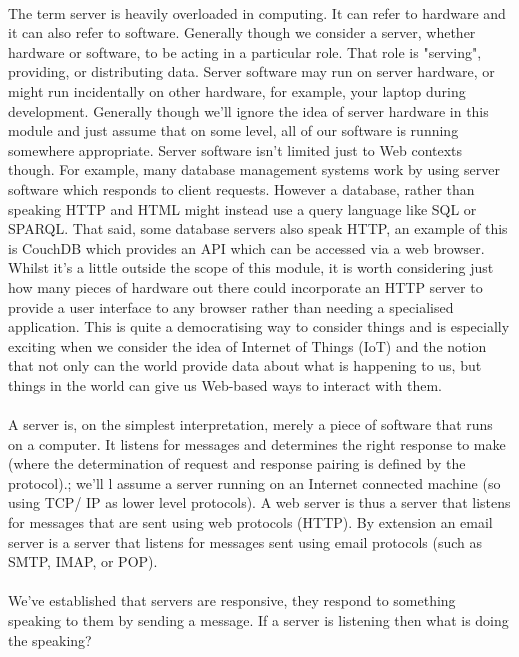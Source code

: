 \documentclass[12pt, a4paper, oneside]{book}
\begin{document}
\paragraph{} The term server is heavily overloaded in computing. It can refer to hardware and it can also refer to software. Generally though we consider a server, whether hardware or software, to be acting in a particular role. That role is "serving", providing, or distributing data. Server software may run on server hardware, or might run incidentally on other hardware, for example, your laptop during development. Generally though we'll ignore the idea of server hardware in this module and just assume that on some level, all of our software is running somewhere appropriate. Server software isn't limited just to Web contexts though. For example, many database management systems work by using server software which responds to client requests. However a database, rather than speaking HTTP and HTML might instead use a query language like SQL or SPARQL. That said, some database servers also speak HTTP, an example of this is CouchDB which provides an API which can be accessed via a web browser. Whilst it's a little outside the scope of this module, it is worth considering just how many pieces of hardware out there could incorporate an HTTP server to provide a user interface to any browser rather than needing a specialised application. This is quite a democratising way to consider things and is especially exciting when we consider the idea of Internet of Things (IoT) and the notion that not only can the world provide data about what is happening to us, but things in the world can give us Web-based ways to interact with them.
\paragraph{} A server is, on the simplest interpretation, merely a piece of software that runs on a computer. It listens for messages and determines the right response to make (where the determination of request and response pairing is defined by the protocol).; we’ll l assume a server running on an Internet connected machine (so using TCP/ IP as lower level protocols). A web server is thus a server that listens for messages that are sent using web protocols (HTTP). By extension an email server is a server that listens for messages sent using email protocols (such as SMTP, IMAP, or POP).
\paragraph{} We've established that servers are responsive, they respond to something speaking to them by sending a message. If a server is listening then what is doing the speaking? 
\end{document}
